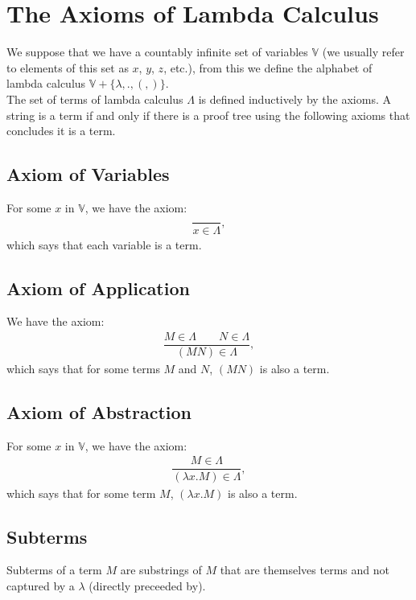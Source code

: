 \section{The Axioms of Lambda Calculus}

We suppose that we have a countably infinite set of variables $\mathbb{V}$
(we usually refer to elements of this set as $x$, $y$, $z$, etc.),
from this we define the alphabet of lambda calculus 
$\mathbb{V} + \{\lambda, ., (, )\}$. 
\\[\baselineskip]
The set of terms of lambda calculus $\Lambda$ is defined inductively 
by the axioms. A string is a term if and only if there is a proof tree using 
the following axioms that concludes it is a term.

\subsection{Axiom of Variables}

For some $x$ in $\mathbb{V}$, we have the axiom: \begin{align*}
    \dfrac{}{x \in \Lambda},
\end{align*} which says that each variable is a term.

\subsection{Axiom of Application}

We have the axiom: \begin{align*}
    \dfrac{M \in \Lambda \qquad N \in \Lambda}{(MN) \in \Lambda},
\end{align*} which says that for some terms $M$ and $N$, $(MN)$ is also
a term.

\subsection{Axiom of Abstraction}

For some $x$ in $\mathbb{V}$, we have the axiom: \begin{align*}
    \dfrac{M \in \Lambda}{(\lambda x.M) \in \Lambda},
\end{align*} which says that for some term $M$, $(\lambda x.M)$ is also
a term.

\subsection{Subterms}

Subterms of a term $M$ are substrings of $M$ that are themselves terms and
not captured by a $\lambda$ (directly preceeded by).

